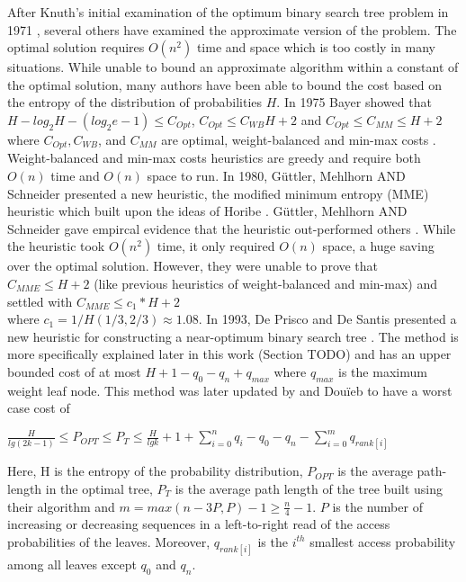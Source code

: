 \documentclass[letterpaper,12pt,titlepage,oneside,final]{book}
\theoremstyle{plain}
\begin{document}
After Knuth's initial examination of the optimum binary search tree problem in 1971 \cite{knuth1971optimum}, several others have examined the approximate version of the problem. The optimal solution requires $O(n^2)$ time and space which is too costly in many situations. While unable to bound an approximate algorithm within a constant of the optimal solution, many authors have been able to bound the cost based on the entropy of the distribution of probabilities $H$. In 1975 Bayer showed that $H-log_2 H-(log_2 e-1) \leq C_{Opt}$, $C_{Opt} \leq C_{WB} H + 2$ and $C_{Opt} \leq C_{MM} \leq H + 2$ where $C_{Opt}, C_{WB}$, and $C_{MM}$ are optimal, weight-balanced and min-max costs \cite{bayer1975improved}. Weight-balanced and min-max costs heuristics are greedy and require both $O(n)$ time and $O(n)$ space to run. In 1980, G{\"u}ttler, Mehlhorn AND Schneider presented a new heuristic, the modified minimum entropy (MME) heuristic \cite{guttler1980binary} which built upon the ideas of Horibe \cite{horibe1977improved}. G{\"u}ttler, Mehlhorn AND Schneider gave empircal evidence that the heuristic out-performed others \cite{guttler1980binary}. While the heuristic took $O(n^2)$ time, it only required $O(n)$ space, a huge saving over the optimal solution. However, they were unable to prove that $C_{MME} \leq H+2$ (like previous heuristics of weight-balanced and min-max) and settled with $C_{MME} \leq c_1*H+2$ \\
 where $c_1=1/H(1/3, 2/3) \approx 1.08$. In 1993, De Prisco and De Santis presented a new heuristic for constructing a near-optimum binary search tree \cite{de1993binary}. The method is more specifically explained later in this work (Section TODO) and has an upper bounded cost of at most $H+1-q_0-q_n+q_{max}$ where $q_{max}$ is the maximum weight leaf node. This method was later updated by and Dou\"{i}eb to have a worst case cost of  \cite{bose2009efficient}
 \begin{center}
$\frac{H}{lg(2k-1)} \leq P_{OPT} \leq P_T \leq \frac{H}{lg k} + 1 + \sum_{i=0}^n q_i - q_0 - q_n - \sum_{i=0}^m q_{rank[i]}$
\end{center}
Here, H is the entropy of the probability distribution, $P_{OPT}$ is the average path-length in the optimal tree, $P_T$ is the average path length of the tree built using their algorithm and $m=max({n-3P,P})-1 \geq \frac{n}{4} - 1$. $P$ is the number of increasing or decreasing sequences in a left-to-right read of the access probabilities of the leaves. Moreover, $q_{rank[i]}$ is the $i^{th}$ smallest access probability among all leaves except $q_0$ and $q_n$. \\ 
 
\end{document}
